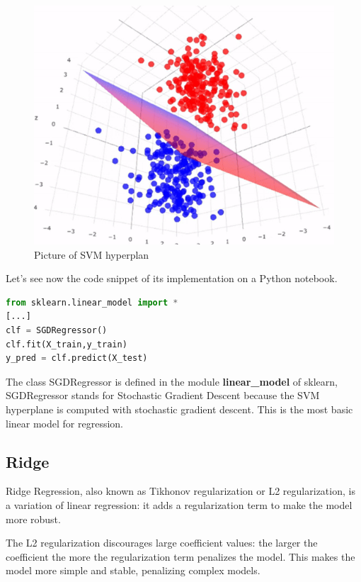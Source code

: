 \begin{figure}
    \centering
    \includegraphics[scale=0.6]{res/ML/svm.png}
    \caption{Picture of SVM hyperplan}
\end{figure}

Let's see now the code snippet of its implementation on a Python notebook.

\begin{lstlisting}[language=Python, caption=SVM implementation]
from sklearn.linear_model import *
[...]
clf = SGDRegressor()
clf.fit(X_train,y_train)
y_pred = clf.predict(X_test)
\end{lstlisting}

The class SGDRegressor is defined in the module \textbf{linear\_model} of sklearn, SGDRegressor stands for Stochastic Gradient Descent because the SVM hyperplane is computed with stochastic gradient descent. This is the most basic linear model for regression.

\subsection{Ridge}
Ridge Regression, also known as Tikhonov regularization or L2 regularization, is a variation of linear regression: it adds a regularization term to make the model more robust.

The L2 regularization discourages large coefficient values: the larger the coefficient the more the regularization term penalizes the model. This makes the model more simple and stable, penalizing complex models.


